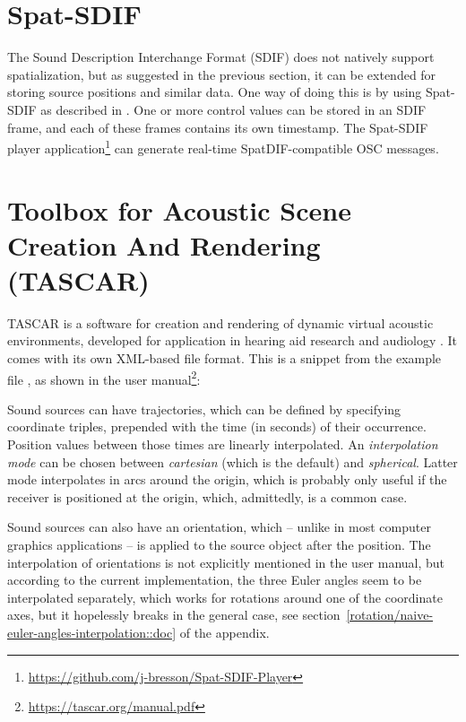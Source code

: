 \section{Spat-SDIF}

The Sound Description Interchange Format (SDIF)
does not natively support spatialization,
but as suggested in the previous section,
it can be extended for storing
source positions and similar data.
One way of doing this is by using
Spat-SDIF as described in
\parencite{bresson2011spatialization}.
One or more control values can be stored in an SDIF frame,
and each of these frames contains its own timestamp.
The Spat-SDIF player
application\footnote{\url{https://github.com/j-bresson/Spat-SDIF-Player}}
can generate real-time SpatDIF-compatible OSC
messages.


\section{Toolbox for Acoustic Scene Creation And Rendering (TASCAR)}

TASCAR is a software for
creation and rendering of dynamic virtual acoustic environments,
developed for application in hearing aid research and audiology
\parencite{grimm2019tascar}.
It comes with its own XML-based file format.
This is a snippet from the example file
,
as shown in the user manual\footnote{\url{https://tascar.org/manual.pdf}}:


\noindent
Sound sources can have trajectories,
which can be defined by specifying coordinate triples,
prepended with the time (in seconds) of their occurrence.
Position values between those times are linearly interpolated.
An \emph{interpolation mode} can be chosen between
\emph{cartesian} (which is the default)
and \emph{spherical}.
Latter mode interpolates in arcs around the origin,
which is probably only useful if the receiver is positioned at the origin,
which, admittedly, is a common case.

Sound sources can also have an orientation,
which -- unlike in most computer graphics applications --
is applied to the source object after the position.
The interpolation of orientations
is not explicitly mentioned in the user manual,
but according to the current implementation,
the three Euler angles seem to be interpolated separately,
which works for rotations around one of the coordinate axes,
but it hopelessly breaks in the general case,
see section~\ref{rotation/naive-euler-angles-interpolation::doc}
of the appendix.


